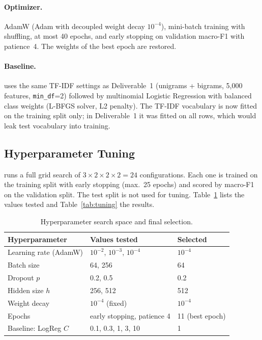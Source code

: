 \documentclass[11pt,a4paper]{article}
\begin{document}
\paragraph{Optimizer.} AdamW (Adam with decoupled weight decay $10^{-4}$), mini-batch training
with shuffling, at most 40 epochs, and early stopping on validation macro-F1 with patience~4.
The weights of the best epoch are restored.

\paragraph{Baseline.}  uses the same TF-IDF settings as Deliverable~1
(unigrams + bigrams, 5,000 features, \texttt{min\_df}=2) followed by multinomial Logistic
Regression with balanced class weights (L-BFGS solver, L2 penalty). The TF-IDF vocabulary is
now fitted on the training split only; in Deliverable~1 it was fitted on all rows, which would
leak test vocabulary into training.

\subsection{Hyperparameter Tuning}
 runs a full grid search of $3 \times 2 \times 2 \times 2 = 24$ configurations.
Each one is trained on the training split with early stopping (max.\ 25 epochs) and scored
by macro-F1 on the validation split. The test split is not used for tuning.
Table~\ref{tab:grid} lists the values tested and Table~\ref{tab:tuning} the results.

\begin{table}[H]
\centering
\small
\begin{tabular}{lll}
\toprule
\textbf{Hyperparameter} & \textbf{Values tested} & \textbf{Selected} \\
\midrule
Learning rate (AdamW) & $10^{-2}$, $10^{-3}$, $10^{-4}$ & $10^{-4}$ \\
Batch size            & 64, 256                         & 64 \\
Dropout $p$           & 0.2, 0.5                        & 0.2 \\
Hidden size $h$       & 256, 512                        & 512 \\
Weight decay          & $10^{-4}$ (fixed)               & $10^{-4}$ \\
Epochs                & early stopping, patience 4      & 11 (best epoch) \\
\midrule
Baseline: LogReg $C$  & 0.1, 0.3, 1, 3, 10              & 1 \\
\bottomrule
\end{tabular}
\caption{Hyperparameter search space and final selection.}
\label{tab:grid}
\end{table}
\end{document}
